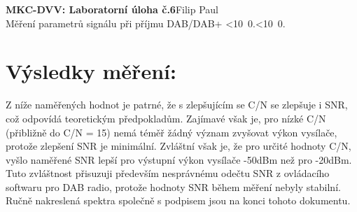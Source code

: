 \documentclass[10pt, a4paper]{article}%
\def\mydate{\leavevmode\hbox{\twodigits\day.\twodigits\month.\the\year}}
\def\twodigits#1{\ifnum#1<10 0\fi\the#1}
\begin{document}
\begin{flushleft}%
	\textbf{\Large{MKC-DVV: Laboratorní úloha č.6}}\hfill Filip Paul\\
	\large{Měření parametrů signálu při příjmu DAB/DAB+ \hfill\mydate}

\end{flushleft}
\section{\Large Výsledky měření:}

Z níže naměřených hodnot je patrné, že s zlepšujícím se C/N se zlepšuje i SNR, což odpovídá teoretickým předpokladům. Zajímavé však je, pro
nízké C/N (přibližně do C/N = 15) nemá téměř žádný význam zvyšovat výkon vysílače, protože zlepšení SNR je minimální. Zvláštní však je, že
pro určité hodnoty C/N, vyšlo naměřené SNR lepší pro výstupní výkon vysílače -50dBm než pro -20dBm. Tuto zvláštnost přisuzuji
především nesprávnému odečtu SNR z ovládacího softwaru pro DAB radio, protože hodnoty SNR během měření nebyly stabilní. Ručně nakreslená spektra
společně s podpisem jsou na konci tohoto dokumentu.
\end{document}
